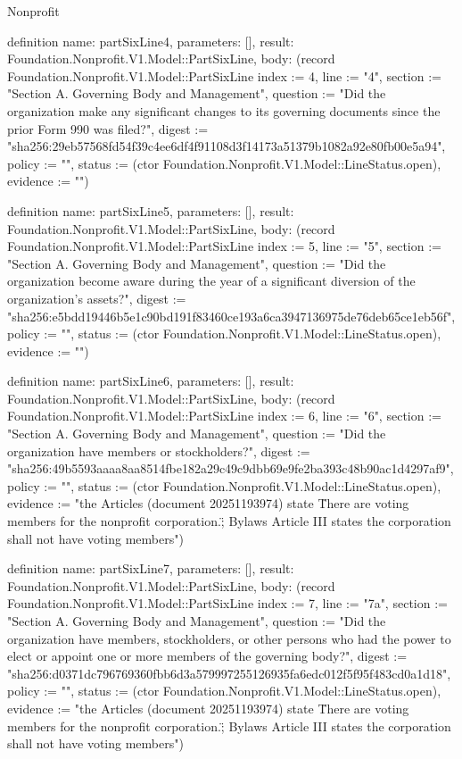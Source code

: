 \begin{lexlean}{Nonprofit}
\begin{semanticmodule}
definition{
  name: partSixLine4,
  parameters: [],
  result: Foundation.Nonprofit.V1.Model::PartSixLine,
  body: (record Foundation.Nonprofit.V1.Model::PartSixLine {index := 4, line := "4", section := "Section A. Governing Body and Management", question := "Did the organization make any significant changes to its governing documents since the prior Form 990 was filed?", digest := "sha256:29eb57568fd54f39c4ee6df4f91108d3f14173a51379b1082a92e80fb00e5a94", policy := "", status := (ctor Foundation.Nonprofit.V1.Model::LineStatus.open), evidence := ""})
}

definition{
  name: partSixLine5,
  parameters: [],
  result: Foundation.Nonprofit.V1.Model::PartSixLine,
  body: (record Foundation.Nonprofit.V1.Model::PartSixLine {index := 5, line := "5", section := "Section A. Governing Body and Management", question := "Did the organization become aware during the year of a significant diversion of the organization’s assets?", digest := "sha256:e5bdd19446b5e1c90bd191f83460ce193a6ca3947136975de76deb65ce1eb56f", policy := "", status := (ctor Foundation.Nonprofit.V1.Model::LineStatus.open), evidence := ""})
}

definition{
  name: partSixLine6,
  parameters: [],
  result: Foundation.Nonprofit.V1.Model::PartSixLine,
  body: (record Foundation.Nonprofit.V1.Model::PartSixLine {index := 6, line := "6", section := "Section A. Governing Body and Management", question := "Did the organization have members or stockholders?", digest := "sha256:49b5593aaaa8aa8514fbe182a29c49c9dbb69e9fe2ba393c48b90ac1d4297af9", policy := "", status := (ctor Foundation.Nonprofit.V1.Model::LineStatus.open), evidence := "the Articles (document 20251193974) state \"There are voting members for the nonprofit corporation.\"; Bylaws Article III states the corporation shall not have voting members"})
}

definition{
  name: partSixLine7,
  parameters: [],
  result: Foundation.Nonprofit.V1.Model::PartSixLine,
  body: (record Foundation.Nonprofit.V1.Model::PartSixLine {index := 7, line := "7a", section := "Section A. Governing Body and Management", question := "Did the organization have members, stockholders, or other persons who had the power to elect or appoint one or more members of the governing body?", digest := "sha256:d0371dc796769360fbb6d3a579997255126935fa6edc012f5f95f483cd0a1d18", policy := "", status := (ctor Foundation.Nonprofit.V1.Model::LineStatus.open), evidence := "the Articles (document 20251193974) state \"There are voting members for the nonprofit corporation.\"; Bylaws Article III states the corporation shall not have voting members"})
}


\end{semanticmodule}
\end{lexlean}
